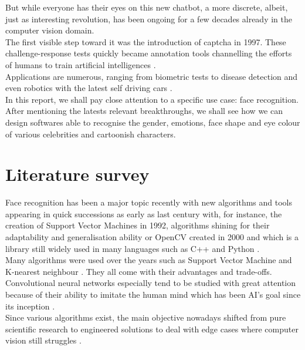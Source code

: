 \documentclass[a4paper,12pt,twoside,twocolumn]{article}
\begin{document}
But while everyone has their eyes on this new chatbot, a more discrete, albeit, just as interesting revolution, has been ongoing for a few decades already in the computer vision domain.\\

The first visible step toward it was the introduction of captcha \autocite{captcha_original} in 1997. These challenge-response tests quickly became annotation tools channelling the efforts of humans to train artificial intelligences \autocite{captcha_recognition}.\\

Applications are numerous, ranging from biometric tests to disease detection \autocite{cv_cancer} and even robotics with the latest self driving cars \autocite{cv_robotics}.\\

In this report, we shall pay close attention to a specific use case: face recognition. After mentioning the latests relevant breakthroughs, we shall see how we can design softwares able to recognise the gender, emotions, face shape and eye colour of various celebrities and cartoonish characters.\\

\section{Literature survey}
\label{sec:orga176fc9}
Face recognition has been a major topic recently with new algorithms and tools appearing in quick successions as early as last century with, for instance, the creation of Support Vector Machines in 1992, algorithms shining for their adaptability and generalisation ability  \autocite{face_recognition_svm} \autocite{app_svm} or OpenCV created in 2000 and which is a library still widely used in many languages such as C++ and Python \autocite{opencv_face_detect}.\\

Many algorithms were used over the years such as Support Vector Machine and K-nearest neighbour \autocite{recognition_algos}. They all come with their advantages and trade-offs. Convolutional neural networks especially tend to be studied with great attention because of their ability to imitate the human mind which has been AI's goal since its inception \autocite{face_detect_cnn} \autocite{thermal_cnn}.\\

Since various algorithms exist, the main objective nowadays shifted from pure scientific research to engineered solutions to deal with edge cases where computer vision still struggles \autocite{face_reading}.\\
\end{document}
